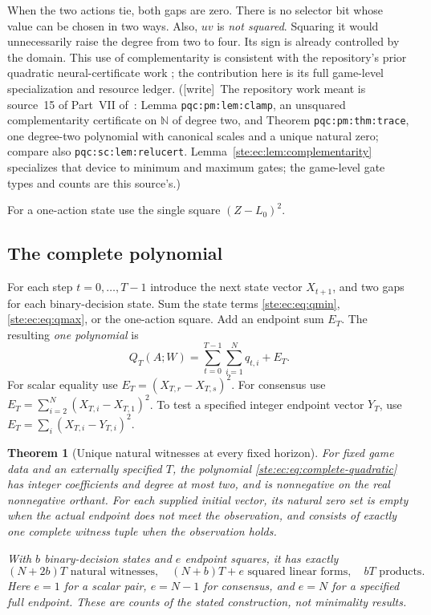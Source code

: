 \documentclass[11pt,letterpaper]{article}
\newtheorem{theorem}{Theorem}[section]
\theoremstyle{definition}
\theoremstyle{remark}
\newcommand{\N}{\mathbb N}
\newcommand{\wtag}{\textup{[write]}}
\begin{document}
When the two actions tie, both gaps are zero. There is no selector bit
whose value can be chosen in two ways. Also, $uv$ is \emph{not squared}.
Squaring it would unnecessarily raise the degree from two to four.
Its sign is already controlled by the domain. This use of complementarity
is consistent with the repository's prior quadratic neural-certificate
work \cite{repoProb}; the contribution here is its full game-level
specialization and resource ledger.
(\wtag\ The repository work meant is source~15 of Part~VII of~\cite{pqc}: Lemma \texttt{pqc:pm:lem:clamp}, an unsquared complementarity certificate on $\N$ of degree two, and Theorem \texttt{pqc:pm:thm:trace}, one degree-two polynomial with canonical scales and a unique natural zero; compare also \texttt{pqc:sc:lem:relucert}. Lemma~\ref{ste:ec:lem:complementarity} specializes that device to minimum and maximum gates; the game-level gate types and counts are this source's.)

For a one-action state use the single square $(Z-L_0)^2$.

\subsection{The complete polynomial}

For each step $t=0,\ldots,T-1$ introduce the next state vector $X_{t+1}$,
and two gaps for each binary-decision state. Sum the state terms
\eqref{ste:ec:eq:qmin}, \eqref{ste:ec:eq:qmax}, or the one-action square. Add an endpoint
sum $E_T$. The resulting \emph{one polynomial} is
\begin{equation}
 Q_T(A;W)=\sum_{t=0}^{T-1}\sum_{i=1}^N q_{t,i}+E_T.
 \label{ste:ec:eq:complete-quadratic}
\end{equation}
For scalar equality use $E_T=(X_{T,r}-X_{T,s})^2$. For consensus use
$E_T=\sum_{i=2}^N(X_{T,i}-X_{T,1})^2$. To test a specified integer endpoint
vector $Y_T$, use $E_T=\sum_i(X_{T,i}-Y_{T,i})^2$.

\begin{theorem}[Unique natural witnesses at every fixed horizon]
\label{ste:ec:thm:quadratic}
For fixed game data and an externally specified $T$, the polynomial
\eqref{ste:ec:eq:complete-quadratic} has integer coefficients and degree at most
two, and is nonnegative on the real nonnegative orthant. For each supplied
initial vector, its natural zero set is empty when the actual endpoint
does not meet the observation, and consists of exactly one complete
witness tuple when the observation holds.

With $b$ binary-decision states and $e$ endpoint squares, it has exactly
\begin{equation}
 \boxed{(N+2b)T\text{ natural witnesses},\quad
        (N+b)T+e\text{ squared linear forms},\quad bT\text{ products}.}
 \label{ste:ec:eq:certificate-counts}
\end{equation}
Here $e=1$ for a scalar pair, $e=N-1$ for consensus, and $e=N$ for a
specified full endpoint. These are counts of the stated construction,
not minimality results.
\end{theorem}
\end{document}
